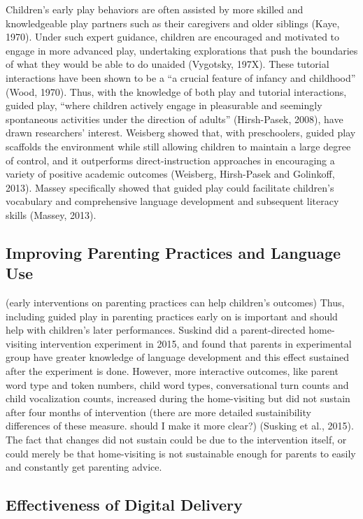 \documentclass[10pt, letterpaper]{article}
\begin{document}
Children's early play behaviors are often assisted by more skilled and
knowledgeable play partners such as their caregivers and older siblings
(Kaye, 1970). Under such expert guidance, children are encouraged and
motivated to engage in more advanced play, undertaking explorations that
push the boundaries of what they would be able to do unaided (Vygotsky,
197X). These tutorial interactions have been shown to be a ``a crucial
feature of infancy and childhood'' (Wood, 1970). Thus, with the
knowledge of both play and tutorial interactions, guided play, ``where
children actively engage in pleasurable and seemingly spontaneous
activities under the direction of adults'' (Hirsh-Pasek, 2008), have
drawn researchers' interest. Weisberg showed that, with preschoolers,
guided play scaffolds the environment while still allowing children to
maintain a large degree of control, and it outperforms
direct-instruction approaches in encouraging a variety of positive
academic outcomes (Weisberg, Hirsh-Pasek and Golinkoff, 2013). Massey
specifically showed that guided play could facilitate children's
vocabulary and comprehensive language development and subsequent
literacy skills (Massey, 2013).

\subsection{Improving Parenting Practices and Language
Use}\label{improving-parenting-practices-and-language-use}

(early interventions on parenting practices can help children's
outcomes) Thus, including guided play in parenting practices early on is
important and should help with children's later performances. Suskind
did a parent-directed home-visiting intervention experiment in 2015, and
found that parents in experimental group have greater knowledge of
language development and this effect sustained after the experiment is
done. However, more interactive outcomes, like parent word type and
token numbers, child word types, conversational turn counts and child
vocalization counts, increased during the home-visiting but did not
sustain after four months of intervention (there are more detailed
sustainibility differences of these measure. should I make it more
clear?) (Susking et al., 2015). The fact that changes did not sustain
could be due to the intervention itself, or could merely be that
home-visiting is not sustainable enough for parents to easily and
constantly get parenting advice.

\subsection{Effectiveness of Digital
Delivery}\label{effectiveness-of-digital-delivery}
\end{document}
